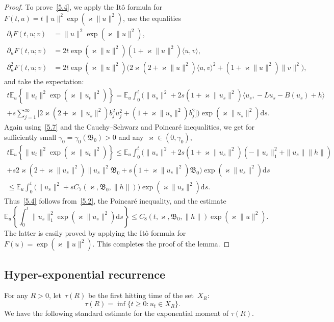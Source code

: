 \documentclass[AHL,Unicode,longabstracts]{cedram}
\newcommand{\p}{\partial}
\newcommand{\E}{{\mathbb E}}
\newcommand{\vk}{{\varkappa}}
\newcommand{\ty}{\infty}
\newcommand{\BBBB}{{\mathfrak B}}
\newcommand{\lag}{\langle}
\newcommand{\rag}{\rangle}
\newcommand{\dd}{\mathrm{d}}
\begin{document}
\begin{proof}
To prove~\eqref{5.4}, we apply the It\^o formula for $F(t,u)=t\|u\|^2\exp(\varkappa \|u\|^2)$, use the equalities
\begin{align*}
\p_t F(t,u;v)&=\|u\|^2\exp(\varkappa \|u\|^2),\\
\p_u F(t,u;v)&=2t\exp(\varkappa \|u\|^2)(1+ \varkappa\|u\|^2)\lag u,v\rag,\\
\p^2_u F(t,u;v)&=2t\exp(\varkappa \|u\|^2)\big(2\vk (2+ \varkappa\|u\|^2)\lag u,v\rag ^2 + (1+ \varkappa\|u\|^2)\|v\|^2 \big),
\end{align*}
and take the expectation:
\begin{multline*}
t\E_u\left\{\|u_t\|^2 \exp(\varkappa \|u_t\|^2)\right\}= \E_u\!\int_0^t\!\! \Bigg(\|u_s\|^2\!+\!2s(1\!+\! \varkappa\|u_s\|^2)\lag u_s, \!-L u_s\!-\!B(u_s)\!+\!h\rag \\
+s\sum_{j=1}^\ty\Big[2\vk (2+ \varkappa\|u_s\|^2)b_j^2u_j^2 + (1+ \varkappa\|u_s\|^2)b_j^2 \Big]\Bigg) \exp(\varkappa \|u_s\|^2) \dd s.
\end{multline*}
Again using~\eqref{5.7} and the Cauchy--Schwarz and Poincar\'e inequalities, we get for sufficiently small $\gamma_0=\gamma_0(\BBBB_{0})>0$ and any~$\vk\in (0,\gamma_0)$,
\begin{multline*}
t\E_u\left\{\|u_t\|^2\exp(\varkappa \|u_t\|^2)\right\}\le \E_u\int_0^t \big(\|u_s\|^2+ 2s(1+ \varkappa\|u_s\|^2) (-\|u_s\|^2_1+ \|u_s\|\|h\|) \\
+ s 2\vk (2+ \varkappa\|u_s\|^2)\|u_s\|^2\BBBB_{0} + s(1+ \varkappa\|u_s\|^2)\BBBB_{0} \big)\exp(\varkappa \|u_s\|^2) \dd s\\
\le \E_u\int_0^t \Big(\|u_s\|^2 +sC_7(\varkappa, \BBBB_{0}, \|h\|) \Big)\exp(\varkappa \|u_s\|^2) \dd s.
\end{multline*}
Thus~\eqref{5.4} follows from~\eqref{5.2}, the Poincar\'e inequality, and the estimate
\[
\E_u \left\{\int_0^t\|u_s\|_1^2\exp(\varkappa \|u_s\|^2)\dd s\right\} \le C_8(t,\varkappa, \BBBB_{0},\|h\|) \exp(\varkappa \|u\|^2).
\]
The latter is easily proved by applying the It\^o formula for $F(u)=\exp(\varkappa \|u\|^2)$. This completes the proof of the lemma.
\end{proof}

\subsection{Hyper-exponential recurrence}

For any $R>0$, let~$\tau(R)$ be the first hitting time of the set~$X_R$:
\begin{equation}\label{E:tau}
\tau(R)= \inf\{t \ge0:u_{t}\in X_R\}.
\end{equation}
We have the following standard estimate for the exponential moment of $\tau(R)$.
\end{document}
